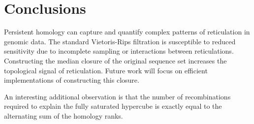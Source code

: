 
\section{Conclusions}
\label{sec:conclusion}
%
Persistent homology can capture and quantify complex patterns of reticulation in genomic data.
The standard Vietoris-Rips filtration is susceptible to reduced sensitivity due to incomplete sampling or interactions between reticulations.
Constructing the median closure of the original sequence set increases the topological signal of reticulation.
Future work will focus on efficient implementations of constructing this closure.

An interesting additional observation is that the number of recombinations required to explain the fully saturated hypercube is exactly equal to the alternating sum of the homology ranks.